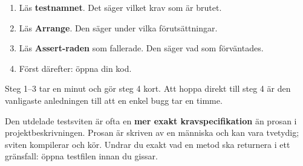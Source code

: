 \begin{enumerate}
  \item Läs \textbf{testnamnet}. Det säger vilket krav som är brutet.
  \item Läs \textbf{Arrange}. Den säger under vilka förutsättningar.
  \item Läs \textbf{Assert-raden} som fallerade. Den säger vad som förväntades.
  \item Först därefter: öppna din kod.
\end{enumerate}

Steg 1--3 tar en minut och gör steg 4 kort. Att hoppa direkt till steg 4 är den vanligaste
anledningen till att en enkel bugg tar en timme.

\begin{aside}
\note Den utdelade testsviten är ofta en \textbf{mer exakt kravspecifikation} än prosan i
projektbeskrivningen. Prosan är skriven av en människa och kan vara tvetydig; sviten kompilerar
och kör. Undrar du exakt vad en metod ska returnera i ett gränsfall: öppna testfilen innan du
gissar.
\end{aside}
